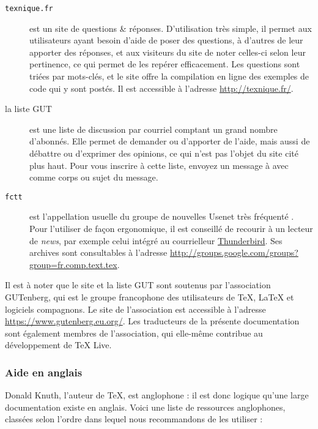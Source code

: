 \documentclass[german, english, french]{article}
\renewcommand{\TL}{\TeX{} Live\xspace}%
\begin{document}
\begin{description}
\item[\texttt{texnique.fr}] est un site de questions \& réponses.  D'utilisation
  très simple, il permet aux utilisateurs ayant besoin d'aide de poser des
  questions, à d'autres de leur apporter des réponses, et aux visiteurs du site
  de noter celles-ci selon leur pertinence, ce qui permet de les repérer
  efficacement.  Les questions sont triées par mots-clés, et le site offre la
  compilation en ligne des exemples de code qui y sont postés.  Il est
  accessible à l'adresse \url{http://texnique.fr/}.

\item[la liste GUT] est une liste de discussion par courriel comptant un grand
  nombre d'abonnés.  Elle permet de demander ou d'apporter de l'aide, mais aussi
  de débattre ou d'exprimer des opinions, ce qui n'est pas l'objet du site cité
  plus haut.  Pour vous inscrire à cette liste, envoyez un message
  à  avec  comme corps ou sujet du
  message.

\item[\texttt{fctt}] est l'appellation usuelle du groupe de nouvelles Usenet
  très fréquenté . Pour l'utiliser de façon ergonomique,
  il est conseillé de recourir à un lecteur de \emph{news}, par exemple celui
  intégré au courrielleur
  \href{https://www.mozilla.org/fr/thunderbird/}{Thunderbird}.  Ses archives
  sont consultables à l'adresse
  \url{http://groups.google.com/groups?group=fr.comp.text.tex}.
\end{description}
Il est à noter que le site  et la liste GUT sont soutenus
par l'association GUTenberg, qui est le groupe francophone des utilisateurs de
\TeX{}, \LaTeX{} et logiciels compagnons. Le site de l'association est
accessible à l'adresse \url{https://www.gutenberg.eu.org/}.  Les traducteurs de
la présente documentation sont également membres de l'association, qui elle-même
contribue au développement de \TL{}.

\subsubsection{Aide en anglais}
Donald Knuth, l'auteur de \TeX, est anglophone : il est donc logique qu'une
large documentation existe en anglais. Voici une liste de ressources
anglophones, classées selon l'ordre dans lequel nous recommandons de les
utiliser :
\end{document}
